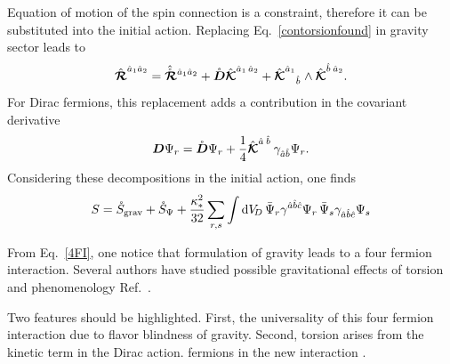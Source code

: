 Equation of motion of the spin connection is a constraint, therefore it can be substituted into the initial action.
Replacing Eq.~\eqref{contorsionfound} in gravity sector leads to  
\begin{align}
  \label{gravdecomp}
  \Rfhn{a}{1}{a}{2} = \Rfhnfree{a}{1}{a}{2} + \free{\Df}\Kfhn{a}{1}{a}{2} + \Kfhnud{a}{1}{b}{}\wedge\Kfhn{b}{}{a}{2}.
\end{align}
For Dirac fermions, this replacement adds a contribution in the covariant derivative 
\begin{align}
  {\boldsymbol{D}}\Psi_r = \mathring{{\boldsymbol{D}}}\Psi_r + \frac{1}{4}\hat{{\boldsymbol{\mathcal{K}}}}^{\hat{a}_{}\,\hat{b}_{}}\,\gamma_{\hat{a}\hat{b}}\Psi_r.
\end{align}
Considering these decompositions in the initial action, one finds
\begin{align}
  \label{4FI}
  S = \free{S}_\text{grav} + \free{S}_\Psi + \frac{\kappa_* ^2}{32}\sum_{r,s}\int \dv[D]\,\bar{\Psi}_r\gamma^{\hat{a}\hat{b}\hat{c}}\Psi_r\,\bar{\Psi}_s\gamma_{\hat{a}\hat{b}\hat{c}}\Psi_s
\end{align}


From Eq.~\eqref{4FI}, one  notice that   formulation of gravity leads to a four fermion interaction. Several authors have studied possible gravitational effects of torsion and   phenomenology Ref.~\cite{Belyaev:1998ax,Fabbri:2010hz,Capozziello:2012xt,Mavromatos:2012cc,CastilloFelisola:2012fy,Fabbri:2013gza,Kostelecky:2007kx}.

Two features  should be highlighted. First, the universality of this four fermion interaction due to flavor blindness of gravity. Second, torsion arises from the kinetic term in the Dirac action.   fermions in the new interaction  .

